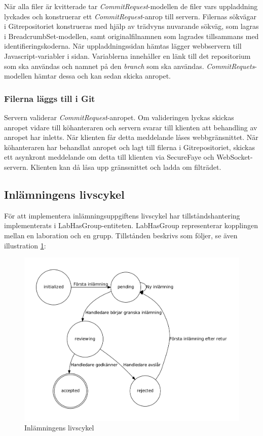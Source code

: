 När alla filer är kvitterade tar \emph{CommitRequest}-modellen de filer vars uppladdning lyckades och konstruerar ett \emph{CommitRequest}-anrop till servern. Filernas sökvägar i Gitrepositoriet konstrueras med hjälp av trädvyns nuvarande sökväg, som lagras i BreadcrumbSet-modellen, samt originalfilnamnen som lagrades tillsammans med identifieringskoderna.
När uppladdningssidan hämtas lägger webbservern till Javascript-variabler i sidan. Variablerna innehåller en länk till det  repositorium som ska användas och namnet på den \emph{branch} som ska användas. \emph{CommitRequets}-modellen hämtar dessa och kan sedan skicka anropet.

\subsubsection{Filerna läggs till i Git}

Servern validerar \emph{CommitRequest}-anropet. Om valideringen lyckas skickas anropet vidare till köhanteraren och servern svarar till klienten att behandling av anropet har inletts. När klienten får detta meddelande låses webbgränsnittet.
När köhanteraren har behandlat anropet och lagt till filerna i Gitrepositoriet, skickas ett asynkront meddelande om detta till klienten via SecureFaye och WebSocket-servern. Klienten kan då låsa upp gränssnittet och ladda om filträdet.

\subsection{Inlämningens livscykel}

För att implementera inlämningsuppgiftens livscykel har tillståndshantering implementerats i LabHasGroup-entiteten. LabHasGroup representerar kopplingen mellan en laboration och en grupp.
Tillstånden beskrivs som följer, se även illustration \ref{fig:cyk}:

\begin{figure}
  \includegraphics[width=15.0cm]{fig/labgroup/state-machine.pdf}             
  \caption[Inlämningsuppgiftens livscykel]
  {Inlämningens livscykel}
  \label{fig:cyk}
\end{figure}

